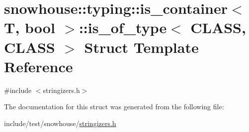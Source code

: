 \hypertarget{structsnowhouse_1_1typing_1_1is__container_1_1is__of__type}{}\section{snowhouse\+::typing\+::is\+\_\+container$<$ T, bool $>$\+::is\+\_\+of\+\_\+type$<$ C\+L\+A\+SS, C\+L\+A\+SS $>$ Struct Template Reference}
\label{structsnowhouse_1_1typing_1_1is__container_1_1is__of__type}


{\ttfamily \#include $<$stringizers.\+h$>$}



The documentation for this struct was generated from the following file\+:\begin{DoxyCompactItemize}
\item 
include/test/snowhouse/\mbox{\hyperlink{stringizers_8h}{stringizers.\+h}}\end{DoxyCompactItemize}
